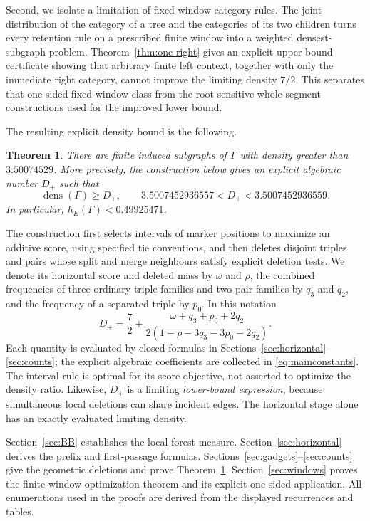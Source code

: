 \documentclass[11pt,a4paper]{article}
\newtheorem{theorem}{Theorem}[section]
\theoremstyle{definition}
\theoremstyle{remark}
\newcommand{\dens}{\operatorname{dens}}
\begin{document}
Second, we isolate a limitation of fixed-window category rules. The joint distribution of the category of a tree and the categories of its two children turns every retention rule on a prescribed finite window into a weighted densest-subgraph problem. Theorem~\ref{thm:one-right} gives an explicit upper-bound certificate showing that arbitrary finite left context, together with only the immediate right category, cannot improve the limiting density $7/2$. This separates that one-sided fixed-window class from the root-sensitive whole-segment constructions used for the improved lower bound.

The resulting explicit density bound is the following.
\begin{theorem}\label{thm:main}
There are finite induced subgraphs of $\Gamma$ with density greater than $3.50074529$. More precisely, the construction below gives an explicit algebraic number $D_+$ such that
\[
\dens(\Gamma)\ge D_+,\qquad
3.5007452936557<D_+<3.5007452936559.
\]
In particular, $h_E(\Gamma)<0.49925471$.
\end{theorem}

The construction first selects intervals of marker positions to maximize an additive score, using specified tie conventions, and then deletes disjoint triples and pairs whose split and merge neighbours satisfy explicit deletion tests. We denote its horizontal score and deleted mass by $\omega$ and $\rho$, the combined frequencies of three ordinary triple families and two pair families by $q_3$ and $q_2$, and the frequency of a separated triple by $p_0$. In this notation
\begin{equation}\label{eq:Dmain}
D_+=\frac72+
\frac{\omega+q_3+p_0+2q_2}{2(1-\rho-3q_3-3p_0-2q_2)}.
\end{equation}
Each quantity is evaluated by closed formulas in Sections~\ref{sec:horizontal}--\ref{sec:counts}; the explicit algebraic coefficients are collected in \eqref{eq:mainconstants}. The interval rule is optimal for its score objective, not asserted to optimize the density ratio. Likewise, $D_+$ is a limiting \emph{lower-bound expression}, because simultaneous local deletions can share incident edges. The horizontal stage alone has an exactly evaluated limiting density.

Section~\ref{sec:BB} establishes the local forest measure. Section~\ref{sec:horizontal} derives the prefix and first-passage formulas. Sections~\ref{sec:gadgets}--\ref{sec:counts} give the geometric deletions and prove Theorem~\ref{thm:main}. Section~\ref{sec:windows} proves the finite-window optimization theorem and its explicit one-sided application. All enumerations used in the proofs are derived from the displayed recurrences and tables.
\end{document}
